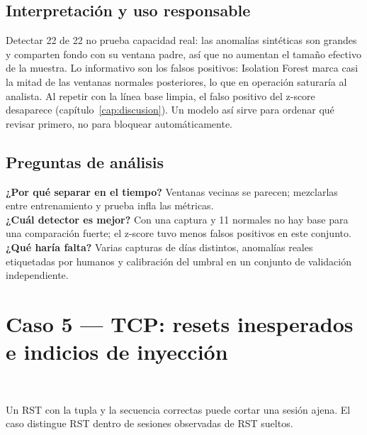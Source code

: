
\subsection{Interpretación y uso responsable}
Detectar 22 de 22 no prueba capacidad real: las anomalías sintéticas son grandes y comparten fondo con su ventana padre, así que no aumentan el tamaño efectivo de la muestra. Lo informativo son los falsos positivos: Isolation Forest marca casi la mitad de las ventanas normales posteriores, lo que en operación saturaría al analista. Al repetir con la línea base limpia, el falso positivo del z-score desaparece (capítulo~\ref{cap:discusion}). Un modelo así sirve para ordenar qué revisar primero, no para bloquear automáticamente.

\subsection{Preguntas de análisis}
\textbf{¿Por qué separar en el tiempo?} Ventanas vecinas se parecen; mezclarlas entre entrenamiento y prueba infla las métricas.\\
\textbf{¿Cuál detector es mejor?} Con una captura y 11 normales no hay base para una comparación fuerte; el z-score tuvo menos falsos positivos en este conjunto.\\
\textbf{¿Qué haría falta?} Varias capturas de días distintos, anomalías reales etiquetadas por humanos y calibración del umbral en un conjunto de validación independiente.

\section{Caso 5 — TCP: resets inesperados e indicios de inyección}
\SINT\ \REAL\ \ANA

Un RST con la tupla y la secuencia correctas puede cortar una sesión ajena. El caso distingue RST dentro de sesiones observadas de RST sueltos.

